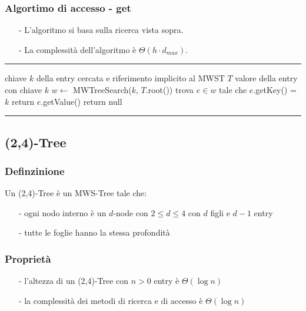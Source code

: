 \documentclass[a4paper]{article}
\makeatletter
\newenvironment{algo}[4]{
	\noindent\rule{\textwidth}{0.4pt}
	\begin{algorithmic}[1]
		\addtocounter{ALG@line}{-1}
		\Procedure{#1}{#2}
		\Require #3
		\Ensure #4
		\Statex }{
		\EndProcedure
	\end{algorithmic}
	\rule{\textwidth}{0.4pt}}
\makeatother
\begin{document}
\subsubsection*{Algortimo di accesso - get}
\begin{itemize}[topsep=3pt, itemsep=0pt]
	\item[-] L'algoritmo si basa sulla ricerca vista sopra.
	\item[-] La complessità dell'algoritmo è \(\Theta(h \cdot d_{max})\).
\end{itemize}
\begin{algo}{get}{$k$}{chiave $k$ della entry cercata e riferimento implicito al MWST $T$}{valore della entry con chiave $k$}
	\State $w \gets$ MWTreeSearch($k$, $T$.root())
		\State trova $e \in w$ tale che $e$.getKey() = $k$
		\State return $e$.getValue()
	\Else
		\State return null
	\EndIf
\end{algo}

\newpage

\subsection{(2,4)-Tree}
\subsubsection*{Definzinione}
Un (2,4)-Tree è un MWS-Tree tale che:
\begin{itemize}[topsep=3pt, itemsep=0pt]
	\item[-] ogni nodo interno è un \(d\)-node con \(2 \leq d \leq 4\) con \(d\) figli e \(d-1\) entry
	\item[-] tutte le foglie hanno la stessa profondità
\end{itemize}

\subsubsection*{Proprietà}
\begin{itemize}[topsep=3pt, itemsep=0pt]
	\item[-] l'altezza di un (2,4)-Tree con \(n>0\) entry è \(\Theta(\log n)\)
	\item[-] la complessità dei metodi di ricerca e di accesso è \(\Theta(\log n)\)
\end{itemize}
\end{document}
